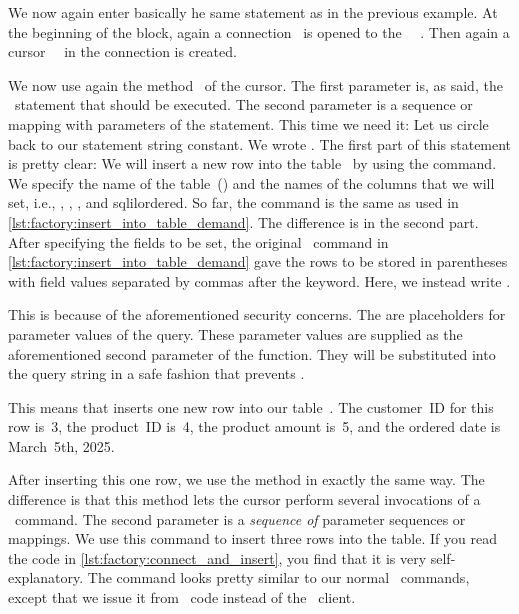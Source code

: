 We now again enter basically he same  statement as in the previous example.
At the beginning of the block, again a connection~ is opened to the \postgresql\ \dbms~\cite{VDGE2022PPDAFP:CC1}.
Then again a cursor~~\cite{VDGE2022PPDAFP:CC2} in the connection is created.
%
\begin{sloppypar}%
We now use again the method~ of the cursor.
The first parameter is, as said, the \sql\ statement that should be executed.
The second parameter is a sequence or mapping with parameters of the statement.
This time we need it:
Let us circle back to our statement string constant.
We wrote .
The first part of this statement is pretty clear:
We will insert a new row into the table~ by using the  command.
We specify the name of the table~() and the names of the columns that we will set, i.e., , , , and sqlil{ordered}.
So far, the command is the same as used in \cref{lst:factory:insert_into_table_demand}.
The difference is in the second part.
After specifying the fields to be set, the original \sql\ command in \cref{lst:factory:insert_into_table_demand} gave the rows to be stored in parentheses with field values separated by commas after the  keyword.
Here, we instead write .%
\end{sloppypar}%
%
This is because of the aforementioned security concerns.
The  are placeholders for parameter values of the query.
These parameter values are supplied as the aforementioned second parameter of the  function.
They will be substituted into the query string in a safe fashion that prevents .

This means that  inserts one new row into our table~.
The customer~ID for this row is~3, the product~ID is~4, the product amount is~5, and the ordered date is March~5th, 2025.

After inserting this one row, we use the  method in exactly the same way.
The difference is that this method lets the cursor perform several invocations of a \sql\ command.
The second parameter is a \emph{sequence of} parameter sequences or mappings.
We use this command to insert three rows into the  table.
If you read the code in \cref{lst:factory:connect_and_insert}, you find that it is very self-explanatory.
The command looks pretty similar to our normal \sql\ commands, except that we issue it from \python\ code instead of the \psql\ client.

